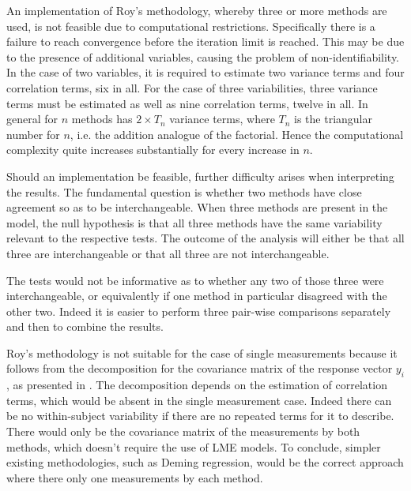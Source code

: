 \documentclass[12pt, a4paper]{report}
\theoremstyle{plain}
\theoremstyle{definition}
\theoremstyle{remark}
\begin{document}
An implementation of Roy's methodology, whereby three or more methods are used, is not feasible due to computational restrictions. Specifically there is a failure to reach convergence before the iteration limit is reached. This may be due to the presence of additional variables, causing the problem of non-identifiability. In the case of two variables, it is required to estimate two variance terms and four correlation terms, six in all. For the case of three variabilities, three variance terms must be estimated as well as nine correlation terms, twelve in all. In general for $n$ methods has $2 \times T_{n}$ variance terms, where $T_n$ is the triangular number for $n$, i.e. the addition analogue of the factorial. Hence the computational complexity quite increases substantially for every increase in $n$.

Should an implementation be feasible, further difficulty arises when interpreting the results. The fundamental question is whether two methods have close agreement so as to be interchangeable. When three methods are present in the model, the null hypothesis is that all three methods have the same variability relevant to the respective tests. The outcome of the analysis will either be that all three are interchangeable or that all three are not interchangeable.

The tests would not be informative as to whether any two of those three were interchangeable, or equivalently if one method in particular disagreed with the other two. Indeed it is easier to perform three pair-wise comparisons separately and then to combine the results.

Roy's methodology is not suitable for the case of single measurements because it follows from the decomposition for the covariance matrix of the response vector $y_{i}$, as presented in \citet{hamlett}. The decomposition depends on the estimation of correlation terms, which would be absent in the single measurement case. Indeed there can be no within-subject variability if there are no repeated terms for it to describe. There would only be the covariance matrix of the measurements by both methods, which doesn't require the use of LME models. To conclude, simpler existing methodologies, such as Deming regression, would be the correct approach where there only one measurements by each method.
\end{document}
